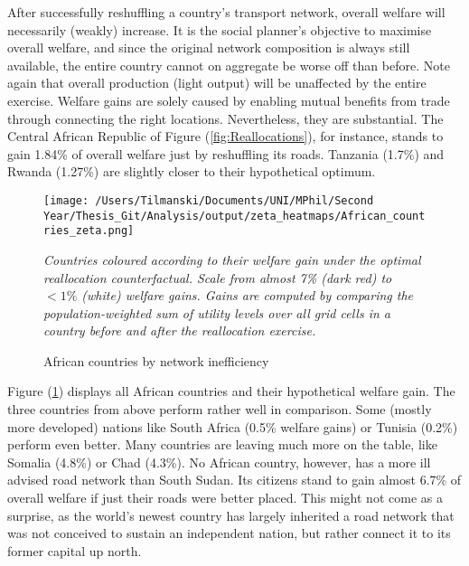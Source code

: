\documentclass[11pt, oneside]{article}   	%
\let\oldref\ref
\renewcommand{\ref}[1]{(\oldref{#1})}
\newcommand{\mysubcaption}[1]{
\justify
\begin{spacing}{0.7}
\textit{\footnotesize #1}
\end{spacing}}
\begin{document}
After successfully reshuffling a country's transport network, overall welfare will necessarily (weakly) increase. It is the social planner's objective to maximise overall welfare, and since the original network composition is always still available, the entire country cannot on aggregate be worse off than before. Note again that overall production (light output) will be unaffected by the entire exercise. Welfare gains are solely caused by enabling mutual benefits from trade through connecting the right locations. Nevertheless, they are substantial. The Central African Republic of Figure \ref{fig:Reallocations}, for instance, stands to gain 1.84\% of overall welfare just by reshuffling its roads. Tanzania (1.7\%) and Rwanda (1.27\%) are slightly closer to their hypothetical optimum.

\begin{figure}
\centering
\caption{African countries by network inefficiency}
\texttt{[image: /Users/Tilmanski/Documents/UNI/MPhil/Second Year/Thesis\_Git/Analysis/output/zeta\_heatmaps/African\_countries\_zeta.png]}

\label{fig:countries_by_welfare_gain}
\mysubcaption{Countries coloured according to their welfare gain under the optimal reallocation counterfactual. Scale from almost 7\% (dark red) to $<1\%$ (white) welfare gains. Gains are computed by comparing the population-weighted sum of utility levels over all grid cells in a country before and after the reallocation exercise.}
\end{figure}

Figure \ref{fig:countries_by_welfare_gain} displays all African countries and their hypothetical welfare gain. The three countries from above perform rather well in comparison. Some (mostly more developed) nations like South Africa (0.5\% welfare gains) or Tunisia (0.2\%) perform even better. Many countries are leaving much more on the table, like Somalia (4.8\%) or Chad (4.3\%). No African country, however, has a more ill advised road network than South Sudan. Its citizens stand to gain almost 6.7\% of overall welfare if just their roads were better placed. This might not come as a surprise, as the world's newest country has largely inherited a road network that was not conceived to sustain an independent nation, but rather connect it to its former capital up north.
\end{document}
